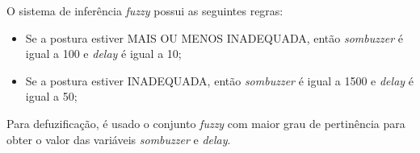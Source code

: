 \documentclass[12pt]{article}
\begin{document}
O sistema de inferência \textit{fuzzy} possui as seguintes regras:

\begin{itemize}
    \item Se a postura estiver MAIS OU MENOS INADEQUADA, então \textit{sombuzzer} é igual a 100 e \textit{delay} é igual a 10;
    \item Se a postura estiver INADEQUADA, então \textit{sombuzzer} é igual a 1500 e \textit{delay} é igual a 50;
\end{itemize}

Para defuzificação, é usado o conjunto \textit{fuzzy} com maior grau de pertinência para obter o valor das variáveis \textit{sombuzzer} e \textit{delay}.



\end{document}
